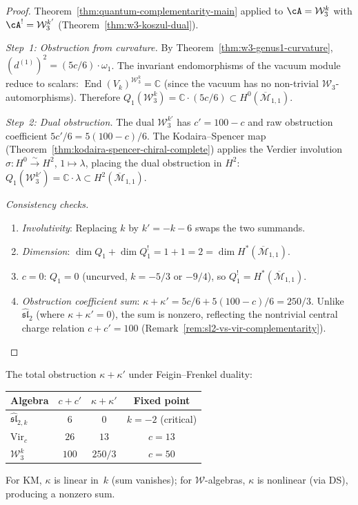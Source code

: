 \begin{proof}
Theorem~\ref{thm:quantum-complementarity-main} applied to
$\cA = \mathcal{W}_3^k$ with
$\cA^! = \mathcal{W}_3^{k'}$
(Theorem~\ref{thm:w3-koszul-dual}).

\emph{Step~1: Obstruction from curvature.}
By Theorem~\ref{thm:w3-genus1-curvature},
$(d^{(1)})^2 = (5c/6) \cdot \omega_1$.  The invariant endomorphisms
of the vacuum module reduce to scalars:
$\operatorname{End}(V_k)^{\mathcal{W}_3^k} = \mathbb{C}$
(since the vacuum has no non-trivial $\mathcal{W}_3$-automorphisms).
Therefore
$Q_1(\mathcal{W}_3^k) = \mathbb{C} \cdot (5c/6) \subset
H^0(\overline{\mathcal{M}}_{1,1})$.

\emph{Step~2: Dual obstruction.}
The dual $\mathcal{W}_3^{k'}$ has $c' = 100 - c$ and raw obstruction
coefficient $5c'/6 = 5(100-c)/6$.  The Kodaira--Spencer map
(Theorem~\ref{thm:kodaira-spencer-chiral-complete}) applies the
Verdier involution $\sigma\colon H^0 \xrightarrow{\sim} H^2$,
$1 \mapsto \lambda$, placing the dual obstruction in $H^2$:
$Q_1(\mathcal{W}_3^{k'}) = \mathbb{C} \cdot \lambda \subset
H^2(\overline{\mathcal{M}}_{1,1})$.

\emph{Consistency checks.}
\begin{enumerate}
\item \emph{Involutivity}: Replacing $k$ by $k' = -k-6$
  swaps the two summands.  \checkmark
\item \emph{Dimension}: $\dim Q_1 + \dim Q_1^! = 1 + 1 = 2 =
  \dim H^*(\overline{\mathcal{M}}_{1,1})$.  \checkmark
\item \emph{$c = 0$}: $Q_1 = 0$ (uncurved, $k = -5/3$ or $-9/4$),
  so $Q_1^! = H^*(\overline{\mathcal{M}}_{1,1})$.  \checkmark
\item \emph{Obstruction coefficient sum}:
  $\kappa + \kappa' = 5c/6 + 5(100-c)/6 = 250/3$.
  Unlike $\widehat{\mathfrak{sl}}_2$ (where $\kappa + \kappa' = 0$),
  the sum is nonzero, reflecting the nontrivial central charge
  relation $c + c' = 100$
  (Remark~\ref{rem:sl2-vs-vir-complementarity}).  \checkmark
\end{enumerate}
\end{proof}

\begin{remark}
\label{rem:w3-kappa-sums}
The total obstruction $\kappa + \kappa'$ under Feigin--Frenkel duality:
\begin{center}
\renewcommand{\arraystretch}{1.3}
\begin{tabular}{lccc}
\toprule
\textbf{Algebra} & $c + c'$ & $\kappa + \kappa'$ & \textbf{Fixed point} \\
\midrule
$\widehat{\mathfrak{sl}}_{2,k}$ & $6$ & $0$ & $k = -2$ (critical) \\
$\mathrm{Vir}_c$ & $26$ & $13$ & $c = 13$ \\
$\mathcal{W}_3^k$ & $100$ & $250/3$ & $c = 50$ \\
\bottomrule
\end{tabular}
\end{center}
For KM, $\kappa$ is linear in~$k$ (sum vanishes); for $\mathcal{W}$-algebras, $\kappa$ is nonlinear (via DS), producing a nonzero sum.
\end{remark}

